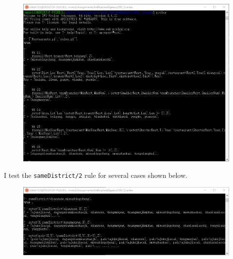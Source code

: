 ﻿\documentclass[a4paper, 11pt]{article}
\begin{document}
\begin{figure}[H]
  \centering
  \includegraphics[width=\linewidth]{fig/results.png}
\end{figure}

I test the \verb'sameDistrict/2' rule for several cases shown below.
\begin{figure}[H]
  \centering
  \includegraphics[width=\linewidth]{fig/results-samedistrict.png}
\end{figure}
\end{document}
